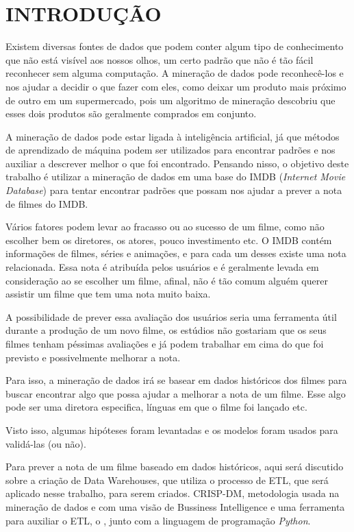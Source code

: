 \section{INTRODUÇÃO}

Existem diversas fontes de dados que podem conter algum tipo de conhecimento que não está visível aos nossos olhos, um certo padrão que não é tão fácil reconhecer sem alguma computação. A mineração de dados pode reconhecê-los e nos ajudar a decidir o que fazer com eles, como deixar um produto mais próximo de outro em um supermercado, pois um algoritmo de mineração descobriu que esses dois produtos são geralmente comprados em conjunto.

A mineração de dados pode estar ligada à inteligência artificial, já que métodos de aprendizado de máquina podem ser utilizados para encontrar padrões e nos auxiliar a descrever melhor o que foi encontrado.
Pensando nisso, o objetivo deste trabalho é utilizar a mineração de dados em uma base do IMDB (\textit{Internet Movie Database}) para tentar encontrar padrões que possam nos ajudar a prever a nota de filmes do IMDB.

Vários fatores podem levar ao fracasso ou ao sucesso de um filme, como não escolher bem os diretores, os atores, pouco investimento etc. O IMDB contém informações de filmes, séries e animações, e para cada um desses existe uma nota relacionada. Essa nota é atribuída pelos usuários e é geralmente levada em consideração ao se escolher um filme, afinal, não é tão comum alguém querer assistir um filme que tem uma nota muito baixa.

A possibilidade de prever essa avaliação dos usuários seria uma ferramenta útil durante a produção de um novo filme, os estúdios não gostariam que os seus filmes tenham péssimas avaliações e já podem trabalhar em cima do que foi previsto e possivelmente melhorar a nota.

Para isso, a mineração de dados irá se basear em dados históricos dos filmes para buscar encontrar algo que possa ajudar a melhorar a nota de um filme. Esse algo pode ser uma diretora especifica, línguas em que o filme foi lançado etc.

Visto isso, algumas hipóteses foram levantadas e os modelos foram usados para validá-las (ou não).

Para prever a nota de um filme baseado em dados históricos, aqui será discutido sobre a criação de Data Warehouses, que utiliza o processo de ETL, que será aplicado nesse trabalho, para serem criados. CRISP-DM, metodologia usada na mineração de dados e com uma visão de Bussiness Intelligence e uma ferramenta para auxiliar o ETL, o \pdi, junto com a linguagem de programação \textit{Python}.

